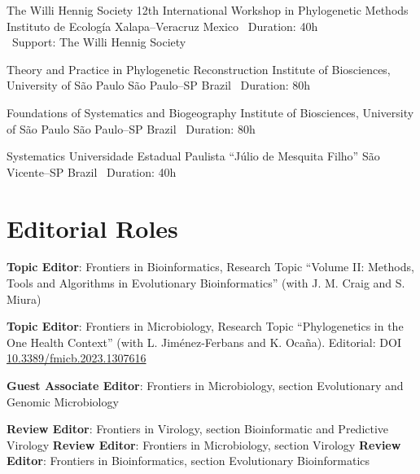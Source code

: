 \documentclass[11pt, letterpaper, sans]{moderncv}
\begin{document}
		{The Willi Hennig Society 12th International Workshop in Phylogenetic Methods}
		{Instituto de Ecología}
		{Xalapa--Veracruz}
		{Mexico}
		{
			\textbullet~Duration: 40h\\
			\textbullet~Support: The Willi Hennig Society
		}

		{Theory and Practice in Phylogenetic Reconstruction}
		{Institute of Biosciences, University of São Paulo}
		{São Paulo--SP}
		{Brazil}
		{
			\textbullet~Duration: 80h
		}

		{Foundations of Systematics and Biogeography}
		{Institute of Biosciences, University of São Paulo}
		{São Paulo--SP}
		{Brazil}
		{
			\textbullet~Duration: 80h
		}

		{Systematics}
		{Universidade Estadual Paulista ``Júlio de Mesquita Filho''}
		{São Vicente--SP}
		{Brazil}
		{
			\textbullet~Duration: 40h
		}


\section{Editorial Roles}



	    {\textbf{Topic Editor}: Frontiers in Bioinformatics, Research Topic ``Volume II: Methods, Tools and Algorithms in Evolutionary Bioinformatics'' (with J. M. Craig and S. Miura)}

	    {\textbf{Topic Editor}: Frontiers in Microbiology, Research Topic ``Phylogenetics in the One Health Context'' (with L. Jiménez-Ferbans and K. Ocaña). Editorial: DOI \href{https://doi.org/10.3389/fmicb.2023.1307616}{10.3389/fmicb.2023.1307616}}

	    {\textbf{Guest Associate Editor}: Frontiers in Microbiology, section Evolutionary and Genomic Microbiology}

	    {\textbf{Review Editor}: Frontiers in Virology, section Bioinformatic and Predictive Virology}
	\cvline{---}
	    {\textbf{Review Editor}: Frontiers in Microbiology, section Virology}
	\cvline{---}
	    {\textbf{Review Editor}: Frontiers in Bioinformatics, section Evolutionary Bioinformatics}
\end{document}

